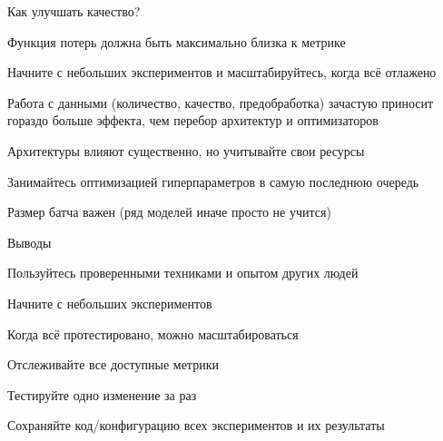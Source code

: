 \documentclass[notes,12pt, aspectratio=169]{beamer}
\newenvironment{wideitemize}{\itemize\addtolength{\itemsep}{10pt}}{\enditemize}
\begin{document}
\begin{frame}{Как улучшать качество?}
	\begin{wideitemize}
		\item Функция потерь должна быть максимально близка к метрике
		
		\item  Начните с небольших экспериментов и масштабируйтесь, когда всё отлажено 
		
		\item  \alert{Работа с данными (количество, качество, предобработка) зачастую приносит гораздо больше эффекта, чем перебор архитектур и оптимизаторов}
		
		\item  Архитектуры влияют существенно, но учитывайте свои ресурсы
		
		\item Занимайтесь оптимизацией гиперпараметров в самую последнюю очередь 
		
		\item Размер батча важен (ряд моделей иначе просто не учится) 
	\end{wideitemize}
\end{frame}


\begin{frame}{Выводы}
	\begin{wideitemize}
		\item  Пользуйтесь проверенными техниками и опытом других людей
		
		\item  Начните с небольших экспериментов
		
		\item  Когда всё протестировано, можно масштабироваться
		
		\item  Отслеживайте все доступные метрики
		
		\item  Тестируйте одно изменение за раз
		
		\item  Сохраняйте код/конфигурацию всех экспериментов и их результаты
		
	\end{wideitemize}
\end{frame}
\end{document}
